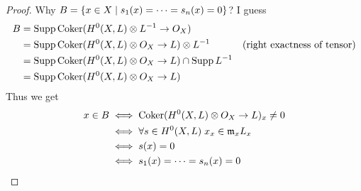 \begin{proof}
  Why $B = \left\{ x \in X \mathrel{} \middle| \mathrel{} s_1(x) = \cdots = s_n(x) = 0 \right\}$? I guess
  \begin{align*}
    B &= \operatorname{Supp} \operatorname{Coker}(H^0(X,L) \otimes L^{-1} \to O_X) \\
    &= \operatorname{Supp} \operatorname{Coker}(H^0(X,L) \otimes O_X \to L) \otimes L^{-1}  &(\text{right exactness of tensor}) \\
    &= \operatorname{Supp} \operatorname{Coker}(H^0(X,L) \otimes O_X \to L) \cap \operatorname{Supp} L^{-1} \\
    &= \operatorname{Supp} \operatorname{Coker}(H^0(X,L) \otimes O_X \to L)
  \end{align*}
  Thus we get
  \begin{align*}
    x \in B &\iff \operatorname{Coker}(H^0(X,L) \otimes O_X \to L)_x \neq 0 \\
    &\iff \forall s \in H^0(X,L) \; x_x \in \mathfrak{m}_x L_x \\
    &\iff s(x) = 0 \\
    &\iff s_1(x) = \cdots = s_n(x) = 0
   \end{align*}
\end{proof}

